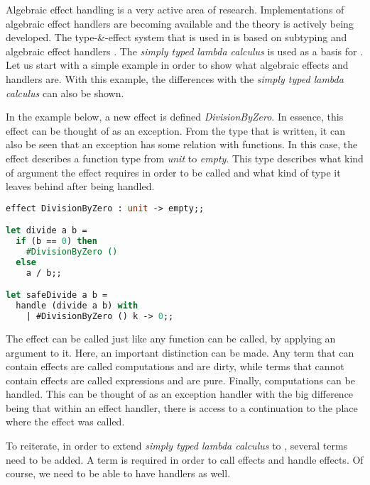 Algebraic effect handling is a very active area of research. Implementations of algebraic effect handlers are becoming available and the theory is actively being developed. The type-\&-effect system that is used in \eff is based on subtyping and algebraic effect handlers \cite{effectsystem}. The \textit{simply typed lambda calculus} is used as a basis for \eff.  Let us start with a simple example in order to show what algebraic effects and handlers are. With this example, the differences with the \textit{simply typed lambda calculus} can also be shown.

In the example below, a new effect is defined \textit{DivisionByZero}. In essence, this effect can be thought of as an exception. From the type that is written, it can also be seen that an exception has some relation with functions. In this case, the effect describes a function type from \textit{unit} to \textit{empty}. This type describes what kind of argument the effect requires in order to be called and what kind of type it leaves behind after being handled. 

\begin{lstlisting}[language=Caml]
effect DivisionByZero : unit -> empty;;

let divide a b = 
  if (b == 0) then 
    #DivisionByZero () 
  else 
    a / b;;

let safeDivide a b = 
  handle (divide a b) with 
    | #DivisionByZero () k -> 0;;
\end{lstlisting}

The effect can be called just like any function can be called, by applying an argument to it. Here, an important distinction can be made. Any term that can contain effects are called computations and are dirty, while terms that cannot contain effects are called expressions and are pure. Finally, computations can be handled. This can be thought of as an exception handler with the big difference being that within an effect handler, there is access to a continuation to the place where the effect was called. 

To reiterate, in order to extend \textit{simply typed lambda calculus} to \eff, several terms need to be added. A term is required in order to call effects and handle effects. Of course, we need to be able to have handlers as well. \cite{pretnar2015introduction}



